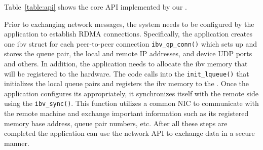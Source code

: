 Table~\ref{table:api} shows the core API implemented by our \projectlibrary{}.
\fi

  Prior to exchanging network messages, the \projecttitle{} system needs to be configured by the application to establish RDMA connections. Specifically, the application creates one ibv struct for each peer-to-peer connection {\tt ibv\_qp\_conn()} which sets up and stores the queue pair, the local and remote IP addresses, and device UDP ports and others. In addition, the application needs to allocate the ibv memory that will be registered to the \projecttitle{} hardware. The code calls into the {\tt init\_lqueue()} that initializes the local queue pairs and  registers the ibv memory to the \projecttitle{}. Once the application configures its \projecttitle{} appropriately, it synchronizes itself with the remote side using the {\tt ibv\_sync()}. This function utilizes a common NIC to communicate with the remote machine and exchange important information such as its registered memory base address, queue pair numbers, etc. After all these steps are completed the application can use the \projecttitle{} network API to exchange data in a secure manner. %

